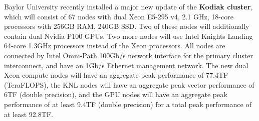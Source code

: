 Baylor University recently installed a major new update of the \textbf{Kodiak cluster}, which will consist of 67 nodes with dual Xeon E5-295 v4, 2.1 GHz, 18-core processors with 256GB RAM, 240GB SSD.  Two of these nodes will additionally contain dual Nvidia P100 GPUs.  Two more nodes will use Intel Knights Landing 64-core 1.3GHz processors instead of the Xeon processors.  All nodes are connected by Intel Omni-Path 100Gb/s network interface for the primary cluster interconnect, and have an 1Gb/s Ethernet management network.   The new dual Xeon compute nodes will have an aggregate peak performance of 77.4TF (TeraFLOPS), the KNL nodes will have an aggregate peak vector performance of 6TF (double precision), and the GPU nodes will have an aggregate peak performance of at least 9.4TF (double precision) for a total peak performance of at least 92.8TF. 